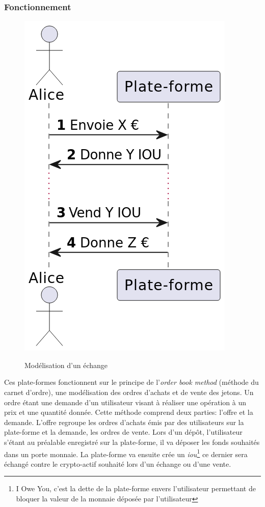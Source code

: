 \subsubsection{Fonctionnement}
\begin{figure}[h!]
    \centering
    \includegraphics[scale=0.2]{centralisation/Achat-Vente.png}
    \label{fig:simplifiedcex}
    \caption{Modélisation d'un échange}
\end{figure}
Ces plate-formes fonctionnent sur le principe de l'\textit{order book method} (méthode du carnet d'ordre\cite{orderBook}), une modélisation des ordres d'achats et de vente des jetons.
Un ordre étant une demande d'un utilisateur visant à réaliser une opération à un prix et une quantité donnée. 
Cette méthode comprend deux parties: l'offre et la demande. L'offre regroupe les ordres d'achats émis par des utilisateurs sur la plate-forme et la demande, les ordres de vente.
Lors d'un dépôt, l'utilisateur s'étant au préalable enregistré sur la plate-forme, il va déposer les fonds souhaités dans un porte monnaie. 
La plate-forme va ensuite crée un \textit{\acrshort{iou}}\footnote{I Owe You, c'est la dette de la plate-forme envers l'utilisateur permettant de bloquer la valeur de la monnaie déposée par l'utilisateur\cite{IOU}} 
ce dernier sera échangé contre le crypto-\gls{actif} souhaité lors d'un échange ou d'une vente. \\ 

